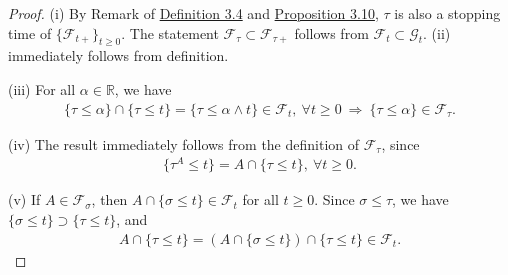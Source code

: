 \documentclass{article}
\numberwithin{equation}{section}
\theoremstyle{plain}
\theoremstyle{definition}
\begin{document}
\begin{proof}
(i) By Remark of \hyperref[def:3.4]{Definition 3.4} and \hyperref[prop:3.10]{Proposition 3.10}, $\tau$ is also a stopping time of $\{\mathscr{F}_{t+}\}_{t\geq 0}$. The statement $\mathscr{F}_\tau\subset\mathscr{F}_{\tau+}$ follows from $\mathscr{F}_t\subset\mathscr{G}_t$. (ii) immediately follows from definition.

\item (iii) For all $\alpha\in\mathbb{R}$, we have
\begin{align*}
	\{\tau\leq\alpha\}\cap\{\tau\leq t\} = \{\tau\leq\alpha\wedge t\}\in\mathscr{F}_t,\ \forall t\geq 0\ \Rightarrow\ \{\tau\leq\alpha\}\in\mathscr{F}_\tau.
\end{align*}

\item (iv) The result immediately follows from the definition of $\mathscr{F}_\tau$, since
\begin{align*}
	\{\tau^A\leq t\}=A\cap\{\tau\leq t\},\ \forall t\geq 0.
\end{align*}

\item (v) If $A\in\mathscr{F}_\sigma$, then $A\cap\{\sigma\leq t\}\in\mathscr{F}_t$ for all $t\geq 0$. Since $\sigma\leq\tau$, we have $\{\sigma\leq t\}\supset\{\tau\leq t\}$, and
\begin{align*}
	A\cap\{\tau\leq t\} = (A\cap\{\sigma\leq t\})\cap\{\tau\leq t\}\in\mathscr{F}_t.
\end{align*}


\end{proof}
\end{document}
